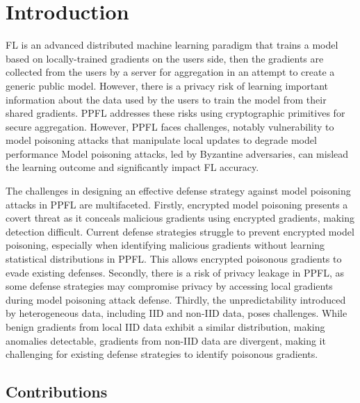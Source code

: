 \section{Introduction}
\label{sec:introduction}

FL is an advanced distributed machine learning paradigm that trains a model based on locally-trained gradients on the users side, then the gradients are collected from the users by a server for aggregation in an attempt to create a generic public model.
However, there is a privacy risk of learning important information about the data used by the users to train the model from their shared gradients.
PPFL addresses these risks using cryptographic primitives for secure aggregation.
However, PPFL faces challenges, notably vulnerability to model poisoning attacks that manipulate local updates to degrade model performance
Model poisoning attacks, led by Byzantine adversaries, can mislead the learning outcome and significantly impact FL accuracy.


The challenges in designing an effective defense strategy against model poisoning attacks in PPFL are multifaceted.
Firstly, encrypted model poisoning presents a covert threat as it conceals malicious gradients using encrypted gradients, making detection difficult.
Current defense strategies struggle to prevent encrypted model poisoning, especially when identifying malicious gradients without learning statistical distributions in PPFL.
This allows encrypted poisonous gradients to evade existing defenses.
Secondly, there is a risk of privacy leakage in PPFL, as some defense strategies may compromise privacy by accessing local gradients during model poisoning attack defense.
Thirdly, the unpredictability introduced by heterogeneous data, including IID and non-IID data, poses challenges.
While benign gradients from local IID data exhibit a similar distribution, making anomalies detectable, gradients from non-IID data are divergent, making it challenging for existing defense strategies to identify poisonous gradients.



\subsection{Contributions}


